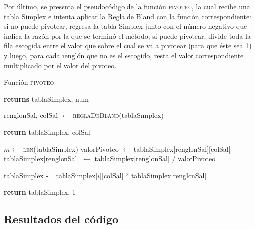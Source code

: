 \documentclass[12pt]{article}
\begin{document}
Por último, se presenta el pseudocódigo de la función \textsc{pivoteo}, la cual recibe una tabla Simplex e intenta aplicar la Regla de Bland con la función correspondiente: si no puede pivotear, regresa la tabla Simplex junto con el número negativo que indica la razón por la que se terminó el método; si puede pivotear, divide toda la fila escogida entre el valor que sobre el cual se va a pivotear (para que éste sea 1) y luego, para cada renglón que no es el escogido, resta el valor correspondiente multiplicado por el valor del pivoteo.
\begin{center}
    \begin{algorithm}[H]
    \caption{Función \textsc{pivoteo}}
    \begin{algorithmic}
     \textbf{returns} tablaSimplex, num

    \State renglonSal, colSal $\gets$ \textsc{reglaDeBland}(tablaSimplex)

     
        \State \textbf{return} tablaSimplex, colSal
    \EndIf

    \State $m \gets$ \textsc{len}(tablaSimplex)
    \State valorPivoteo $\gets$ tablaSimplex[renglonSal][colSal]
    \State tablaSimplex[renglonSal] $\gets$ tablaSimplex[renglonSal] / valorPivoteo
    
            \State tablaSimplex -= tablaSimplex[$i$][colSal] * tablaSimplex[renglonSal]        
        \EndIf
    \EndFor

    \State \textbf{return} tablaSimplex, 1

    \EndFunction
    \end{algorithmic}
    \end{algorithm}
\end{center}

\subsection{Resultados del código}
\end{document}

